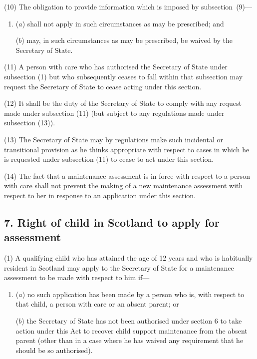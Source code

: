 \documentclass[12pt,a4paper]{article}
\begin{document}
(10) The obligation to provide information which is imposed by subsection~(9)—
\begin{enumerate}\item[]
($a$) shall not apply in such circumstances as may be prescribed; and

($b$) may, in such circumstances as may be prescribed, be waived by the Secretary of State.
\end{enumerate}

(11) A person with care who has authorised the Secretary of State under subsection (1)  but who subsequently ceases to fall within that subsection may request the Secretary of State to cease acting under this section.

(12) It shall be the duty of the Secretary of State to comply with any request made under subsection (11)  (but subject to any regulations made under subsection (13)).

(13) The Secretary of State may by regulations make such incidental or transitional provision as he thinks appropriate with respect to cases in which he is requested under subsection (11)  to cease to act under this section.

(14) The fact that a maintenance assessment is in force with respect to a person with care shall not prevent the making of a new maintenance assessment with respect to her in response to an application under this section.


\subsection{7. Right of child in Scotland to apply for assessment}

(1) A qualifying child who has attained the age of 12 years and who is habitually resident in Scotland may apply to the Secretary of State for a maintenance assessment to be made with respect to him if—
\begin{enumerate}\item[]
($a$) no such application has been made by a person who is, with respect to that child, a person with care or an absent parent; or

($b$) the Secretary of State has not been authorised under section 6 to take action under this Act to recover child support maintenance from the absent parent (other than in a case where he has waived any requirement that he should be so authorised).
\end{enumerate}
\end{document}
